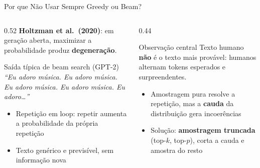\documentclass[aspectratio=169, xcolor=dvipsnames]{beamer}
\begin{document}
  \begin{frame}{Por que Não Usar Sempre Greedy ou Beam? \cite{holtzman2020degeneration}}
    \begin{columns}[T]
      \begin{column}{0.52\textwidth}
        \textbf{Holtzman et al.\ (2020)}: em geração aberta, maximizar a probabilidade produz \textbf{degeneração}.\\[0.4em]
        \begin{alertblock}{Saída típica de beam search (GPT-2)}
          \footnotesize\textit{``Eu adoro música. Eu adoro música. Eu adoro música. Eu adoro música. Eu adoro\ldots''}
        \end{alertblock}
        \vspace{0.3em}
        \begin{itemize}
          \item Repetição em loop: repetir aumenta a probabilidade da própria repetição
          \item Texto genérico e previsível, sem informação nova
        \end{itemize}
      \end{column}
      \begin{column}{0.44\textwidth}
        \begin{block}{Observação central}
          Texto humano \textbf{não} é o texto mais provável: humanos alternam tokens esperados e surpreendentes.
        \end{block}
        \vspace{0.3em}
        \begin{itemize}
          \item Amostragem pura resolve a repetição, mas a \textbf{cauda} da distribuição gera incoerências
          \item Solução: \textbf{amostragem truncada} (top-$k$, top-$p$), corta a cauda e amostra do resto
        \end{itemize}
      \end{column}
    \end{columns}
  \end{frame}
\end{document}

